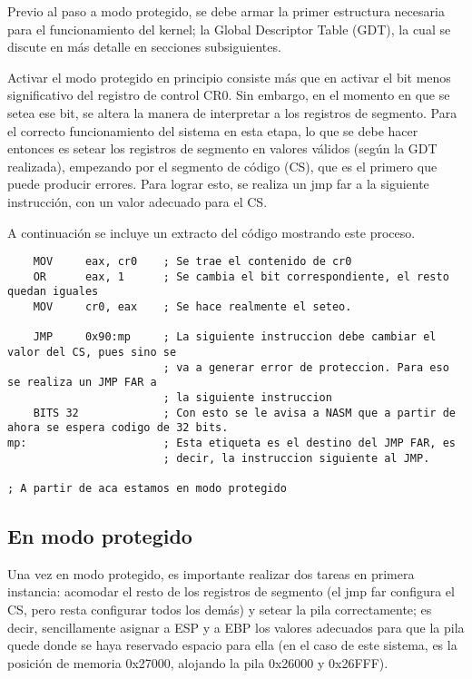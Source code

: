 	Previo al paso a modo protegido, se debe armar la primer estructura necesaria para 
el funcionamiento del kernel; la Global Descriptor Table (GDT), la cual se discute en más 
detalle en secciones subsiguientes.

	Activar el modo protegido en principio consiste más que en activar el bit menos significativo del 
registro de control CR0. Sin embargo, en el momento en que se setea ese bit, se altera la manera de 
interpretar a los registros de segmento. Para el correcto funcionamiento del sistema en esta etapa, lo que se debe hacer entonces es setear los registros de segmento en valores válidos (según la GDT realizada), 
empezando por el segmento de código (CS), que es el primero que puede producir errores. Para lograr esto,
se realiza un jmp far a la siguiente instrucción, con un valor adecuado para el CS.

	A continuación se incluye un extracto del código mostrando este proceso.

\begin{verbatim}
	MOV		eax, cr0	; Se trae el contenido de cr0
	OR		eax, 1		; Se cambia el bit correspondiente, el resto quedan iguales
	MOV		cr0, eax	; Se hace realmente el seteo.
	
	JMP		0x90:mp		; La siguiente instruccion debe cambiar el valor del CS, pues sino se
						; va a generar error de proteccion. Para eso se realiza un JMP FAR a 
						; la siguiente instruccion
	BITS 32				; Con esto se le avisa a NASM que a partir de ahora se espera codigo de 32 bits.
mp:						; Esta etiqueta es el destino del JMP FAR, es 
						; decir, la instruccion siguiente al JMP.

; A partir de aca estamos en modo protegido
\end{verbatim}

\subsection{En modo protegido}

	Una vez en modo protegido, es importante realizar dos tareas en primera instancia: acomodar el 
resto de los registros de segmento (el jmp far configura el CS, pero resta configurar todos los demás)
y setear la pila correctamente; es decir, sencillamente asignar a ESP y a EBP los valores adecuados para que la pila quede donde se haya reservado espacio para ella (en el caso de este sistema, es la posición de memoria 0x27000, alojando la pila 0x26000 y 0x26FFF).


